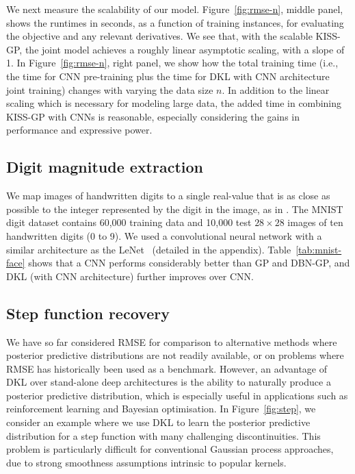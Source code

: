\documentclass[twoside,11pt]{article}
\begin{document}
We next measure the scalability of our model. Figure~\ref{fig:rmse-n}, middle panel, shows the runtimes in seconds, as a function of training instances, for evaluating the objective and any relevant derivatives. We see that, with the scalable KISS-GP, the joint model achieves a roughly linear asymptotic scaling, with a slope of 1.
In Figure~\ref{fig:rmse-n}, right panel, we show how the total training time (i.e., the time for CNN pre-training plus the time for DKL with CNN architecture joint training) changes with varying the data size $n$. In addition to the linear scaling which is necessary for modeling large data, the added time in combining KISS-GP with CNNs is reasonable, especially considering the gains in performance and expressive power.

\subsection{Digit magnitude extraction}
\label{sec:exp-mnist}
We map images of handwritten digits to a single real-value that is as close as possible to the integer represented by the digit in the image, as in \citet{salakhutdinov2008}. The MNIST digit dataset contains 60,000 training data and 10,000 test $28\times 28$ images of ten handwritten digits (0 to 9). We used a convolutional neural network with a similar architecture as the LeNet~\citep{lecun1998gradient} (detailed in the appendix). Table~\ref{tab:mnist-face} shows that a CNN performs considerably better than GP and DBN-GP, and DKL (with CNN architecture) further improves over CNN.

\subsection{Step function recovery}
\label{sec: step}

We have so far considered RMSE for comparison to alternative methods where posterior predictive distributions are not readily available, or on problems where RMSE has historically been used as a benchmark.  However, an advantage of DKL over stand-alone deep architectures is the ability to naturally produce a posterior predictive distribution, which is especially useful in applications such as reinforcement learning and Bayesian optimisation. 
In Figure~\ref{fig:step}, we consider an example where we use DKL to learn the posterior predictive distribution for a step function with many challenging discontinuities. This problem is particularly difficult for conventional Gaussian process approaches, due to strong smoothness assumptions intrinsic to popular kernels.  
\end{document}
